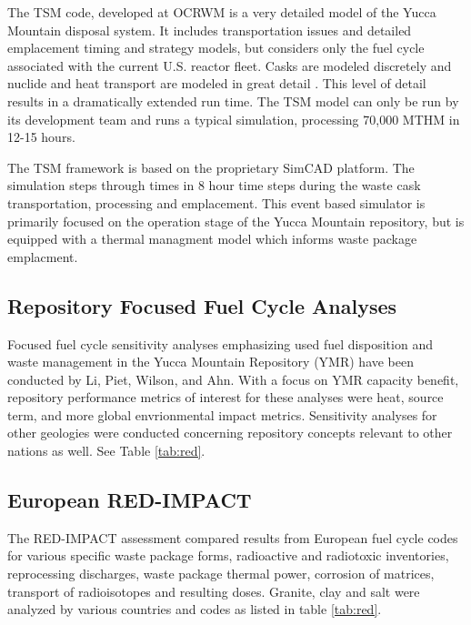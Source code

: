 The \gls{TSM} code, 
developed at \gls{OCRWM} is a very detailed model of the Yucca Mountain disposal 
system. It includes transportation issues and detailed emplacement timing and 
strategy models, but considers only the fuel cycle associated with the current  
U.S.  reactor fleet. Casks are modeled discretely and nuclide and heat transport 
are modeled in great detail .  This level of detail 
results in a dramatically extended run time. The \gls{TSM} model can only be 
run by its development team and runs a typical simulation, processing 70,000 
MTHM in 12-15 hours.  \cite{turner_discrete_2010} 

The TSM framework is based on the proprietary SimCAD platform. The simulation 
steps through times in 8 hour time steps during the waste cask transportation, 
processing and emplacement. This event based simulator is primarily focused on 
the operation stage of the Yucca Mountain repository, but is equipped with a 
thermal managment model which informs waste package emplacment.


\subsection{Repository Focused Fuel Cycle Analyses}

Focused fuel cycle sensitivity analyses emphasizing used fuel disposition and
waste management in the Yucca Mountain Repository (YMR) have been conducted by
Li, Piet, Wilson, and Ahn. With a focus on YMR capacity benefit, repository
performance metrics of interest for these analyses were heat, source term, and
more global envrionmental impact metrics.  Sensitivity analyses for other
geologies were conducted concerning repository concepts relevant to other
nations as well. See Table \ref{tab:red}.

\subsection{European RED-IMPACT} 

The RED-IMPACT assessment compared
results from European fuel cycle codes for various specific waste package
forms, radioactive and radiotoxic inventories, reprocessing discharges,  waste
package thermal power, corrosion of matrices, transport of radioisotopes and
resulting doses.  Granite, clay and salt were analyzed by various countries and 
codes as listed in table \ref{tab:red}.




